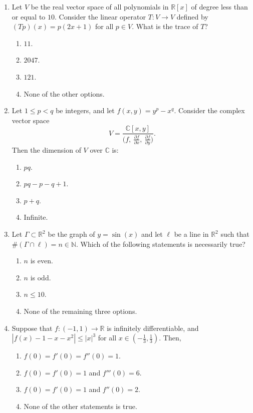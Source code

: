 \documentclass[11pt, a4paper]{article}
\begin{document}
\begin{enumerate}
\item Let $V$ be the real vector space of all polynomials in $\mathbb{R}[x]$ of degree less than or equal to $10$. Consider the linear operator $T:V\to V$ defined by $(Tp)(x)=p(2x+1)$ for all $p\in V$. What is the trace of $T$?
\begin{enumerate}[label=(\alph*)]
\item $11$. \item $2047$. \item $121$. \item None of the other options.
\end{enumerate}

\item Let $1\le p<q$ be integers, and let $f(x,y)=y^p-x^q$. Consider the complex vector space
\[ V=\frac{\mathbb{C}[x,y]}{\bigl(f,\ \frac{\partial f}{\partial x},\ \frac{\partial f}{\partial y}\bigr)}. \]
Then the dimension of $V$ over $\mathbb{C}$ is:
\begin{enumerate}[label=(\alph*)]
\item $pq$. \item $pq-p-q+1$. \item $p+q$. \item Infinite.
\end{enumerate}

\item Let $\Gamma\subset\mathbb{R}^2$ be the graph of $y=\sin(x)$ and let $\ell$ be a line in $\mathbb{R}^2$ such that $\#(\Gamma\cap\ell)=n\in\mathbb{N}$. Which of the following statements is necessarily true?
\begin{enumerate}[label=(\alph*)]
\item $n$ is even.
\item $n$ is odd.
\item $n\le10$.
\item None of the remaining three options.
\end{enumerate}

\item Suppose that $f:(-1,1)\to\mathbb{R}$ is infinitely differentiable, and $|f(x)-1-x-x^2|\le|x|^3$ for all $x\in(-\tfrac13,\tfrac13)$. Then,
\begin{enumerate}[label=(\alph*)]
\item $f(0)=f'(0)=f''(0)=1$.
\item $f(0)=f'(0)=1$ and $f'''(0)=6$.
\item $f(0)=f'(0)=1$ and $f''(0)=2$.
\item None of the other statements is true.
\end{enumerate}


\end{enumerate}
\end{document}
